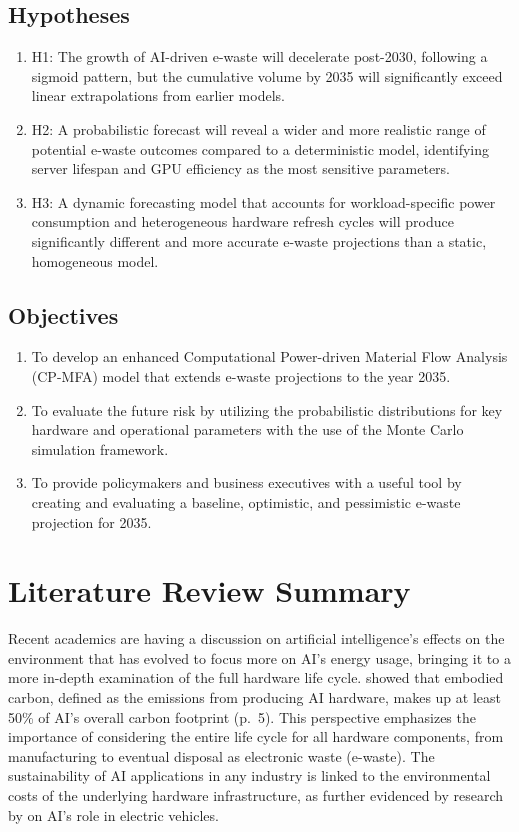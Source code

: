 \documentclass[a4paper, 12pt]{article}
\begin{document}
\subsection*{Hypotheses}
\begin{enumerate}
	\item H1: The growth of AI-driven e-waste will decelerate post-2030, following a sigmoid pattern, but the cumulative volume by 2035 will significantly exceed linear extrapolations from earlier models.
	\item H2: A probabilistic forecast will reveal a wider and more realistic range of potential e-waste outcomes compared to a deterministic model, identifying server lifespan and GPU efficiency as the most sensitive parameters.
	\item H3: A dynamic forecasting model that accounts for workload-specific power consumption and heterogeneous hardware refresh cycles will produce significantly different and more accurate e-waste projections than a static, homogeneous model.
\end{enumerate}

\subsection*{Objectives}
\begin{enumerate}
	\item To develop an enhanced Computational Power-driven Material Flow Analysis (CP-MFA) model that extends e-waste projections to the year 2035.
	\item To evaluate the future risk by utilizing the probabilistic distributions for key hardware and operational parameters with the use of the Monte Carlo simulation framework.
	\item To provide policymakers and business executives with a useful tool by creating and evaluating a baseline, optimistic, and pessimistic e-waste projection for 2035.
\end{enumerate}

\section{Literature Review Summary}
Recent academics are having a discussion on artificial intelligence's effects on the environment that has evolved to focus more on AI's energy usage, bringing it to a more in-depth examination of the full hardware life cycle. \citet{Wu2022} showed that embodied carbon, defined as the emissions from producing AI hardware, makes up at least 50\% of AI's overall carbon footprint (p.~5). This perspective emphasizes the importance of considering the entire life cycle for all hardware components, from manufacturing to eventual disposal as electronic waste (e-waste). The sustainability of AI applications in any industry is linked to the environmental costs of the underlying hardware infrastructure, as further evidenced by research by \citet{M.rauf2024} on AI's role in electric vehicles.
\end{document}
